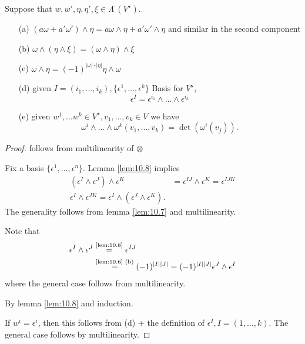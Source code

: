 \begin{proposition}\label{prop:10.9}
    Suppose that \(w,w',\eta,\eta',\xi\in \Lambda^{\cdot}(V^\star)\).
    \begin{enumerate}
        \item[(a)] \((a\omega+a'\omega')\wedge \eta=a\omega \wedge \eta + a' \omega'\wedge \eta\) and similar in the second component
        \item[(b)] \(\omega\wedge (\eta\wedge \xi)= (\omega\wedge \eta)\wedge \xi\)
        \item[(c)] \(\omega\wedge \eta=(-1)^{|\omega|\cdot |\eta|}\eta\wedge \omega\)
        \item[(d)] given \(I=(i_1,\dots,i_k),\{\epsilon^1,\dots,\epsilon^k\}\) Basis for \(V^\star\),\[\epsilon^I=\epsilon^{i_1}\wedge\dots\wedge\epsilon^{i_k}\]
        \item[(e)] given \(w^1,\dots w^k\in V^\star,v_1,\dots,v_k\in V\) we have \[\omega^i\wedge\dots\wedge\omega^k(v_1,\dots,v_k)=\det(\omega^i(v_j)).\]   
    \end{enumerate}
\end{proposition}

\begin{proof}
     follows from multilinearity of \(\otimes\)
    
     Fix a basis \(\{\epsilon^1,\dots,\epsilon^n\}\). Lemma \ref{lem:10.8} implies 
    \begin{align*}
        (\epsilon^I\wedge \epsilon^J)\wedge \epsilon^K&=\epsilon^{IJ}\wedge \epsilon^K=\epsilon^{IJK}\\
        \epsilon^I\wedge \epsilon^{JK}=\epsilon^{I}\wedge (\epsilon^{J}\wedge \epsilon^K).
    \end{align*}
    The generality follows from lemma \ref{lem:10.7} and multilinearity.

     Note that
    \begin{align*}
        \epsilon^I\wedge \epsilon^J&\stackrel{\text{\ref{lem:10.8}}}{=}\epsilon^{IJ}\\
        &\stackrel{\text{\ref{lem:10.6} (b)}}{=} (-1)^{|I||J|}=(-1)^{|I||J|}\epsilon^J\wedge \epsilon^I
    \end{align*}
    where the general case follows from multilinearity.

     By lemma \ref{lem:10.8} and induction.

     If \(w^i=\epsilon^i\), then this follows from
    (d) + the definition of \(\epsilon^I,I=(1,\dots,k).\) The general case follows 
    by multilinearity.
\end{proof}

